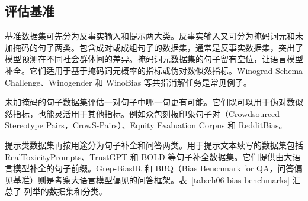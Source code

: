 \subsection{评估基准}
基准数据集可先分为反事实输入和提示两大类。反事实输入又可分为掩码词元和未加掩码的句子两类。包含成对或成组句子的数据集，通常是反事实数据集，突出了模型预测在不同社会群体间的差异。掩码词元数据集的句子留有空位，让语言模型补全。它们适用于基于掩码词元概率的指标或伪对数似然指标。Winograd Schema Challenge、Winogender 和 WinoBias 等共指消解任务是常见例子。

未加掩码的句子数据集评估一对句子中哪一句更有可能。它们既可以用于伪对数似然指标，也能灵活用于其他指标。例如众包刻板印象句子对（Crowdsourced Stereotype Pairs，CrowS-Pairs）、Equity Evaluation Corpus 和 RedditBias。

提示类数据集再按用途分为句子补全和问答两类。用于提示文本续写的数据集包括 RealToxicityPrompts、TrustGPT 和 BOLD 等句子补全数据集。它们提供由大语言模型补全的句子前缀。Grep-BiasIR 和 BBQ（Bias Benchmark for QA，问答偏见基准）则是考察大语言模型偏见的问答框架。表~\ref{tab:ch06-bias-benchmarks} 汇总了 列举的数据集和分类。


